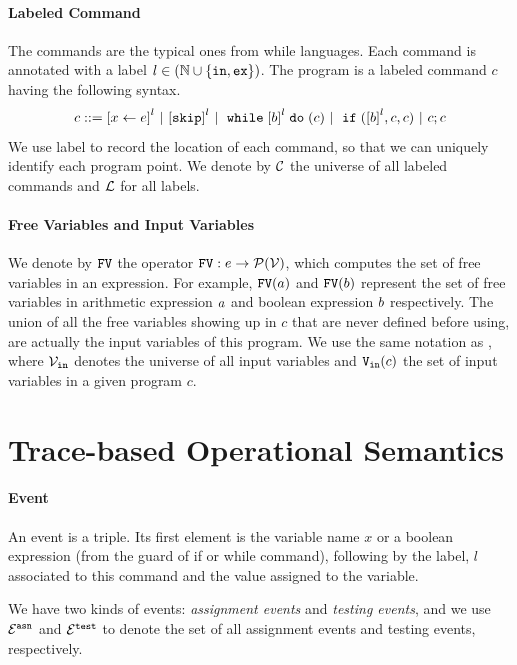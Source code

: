 \paragraph{Labeled Command}
The commands are the typical ones from while languages. Each command is annotated with a label $l \in (\mathbb{N} \cup \{\mathtt{in}, \mathtt{ex}\})$. The program is a labeled command $c$ having the following syntax. 
\[
{c} ::= 
\clabel{\assign{x}{\expr}}^l 
~|~  \clabel{\eskip}^l
~|~ \ewhile \clabel{\bexpr}^{l} \edo ({c})
~|~ \eif(\clabel{\bexpr}^{l} , {c}, {c}) 
~|~ {c};{c} 
\]
We use label to record
the location of each command, so that we can uniquely identify each program point.
We denote by $\mathcal{C}$ the universe of all labeled commands and $\mathcal{L}$ for all labels.

\paragraph{Free Variables and Input Variables}
  We denote by $\mathtt{FV}$ the operator $\mathtt{FV}: e \to \mathcal{P}(\mathcal{V})$, which computes the set of free variables in an expression. For example,
  $\mathtt{FV}(a)$ and $\mathtt{FV}(b)$ represent the set of free variables in arithmetic
  expression $a$ and boolean expression $b$ respectively.
  The union of all the free variables
  showing up in $c$ that are never defined before using, are actually the input variables of this program.
  We use the same notation as , where $\mathcal{V}_{\mathtt{in}}$ denotes the universe of all input variables and $\mathtt{V_{\mathtt{in}}}(c)$ the set of input variables in a given program $c$.

\section{{Trace-based Operational Semantics}}
\label{sec:psRB-language-semantics}
\paragraph{Event}
An event is a triple.
Its first element is the variable name $x$
or a boolean expression (from the guard of if or while command), 
following by 
 the label, $l$ associated to this command and the value assigned to the variable.

 We have two kinds of events: \emph{assignment events} and \emph{testing events},
 and we use $\mathcal{E}^{\mathtt{{asn}}}$ and $\mathcal{E}^{\mathtt{{test}}}$ to denote the set of all assignment events and testing events, respectively.

